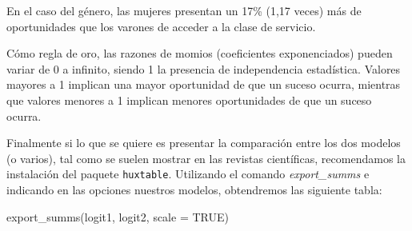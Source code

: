 \documentclass[
]{book}
\newenvironment{Shaded}{\begin{snugshade}}{\end{snugshade}}
\newcommand{\AttributeTok}[1]{\textcolor[rgb]{0.77,0.63,0.00}{#1}}
\newcommand{\ConstantTok}[1]{\textcolor[rgb]{0.00,0.00,0.00}{#1}}
\newcommand{\FunctionTok}[1]{\textcolor[rgb]{0.00,0.00,0.00}{#1}}
\newcommand{\NormalTok}[1]{#1}
\begin{document}
En el caso del género, las mujeres presentan un 17\% (1,17 veces) más de oportunidades que los varones de acceder a la clase de servicio.

Cómo regla de oro, las razones de momios (coeficientes exponenciados) pueden variar de 0 a infinito, siendo 1 la presencia de independencia estadística. Valores mayores a 1 implican una mayor oportunidad de que un suceso ocurra, mientras que valores menores a 1 implican menores oportunidades de que un suceso ocurra.

Finalmente si lo que se quiere es presentar la comparación entre los dos modelos (o varios), tal como se suelen mostrar en las revistas científicas, recomendamos la instalación del paquete \texttt{huxtable}. Utilizando el comando \emph{export\_summs} e indicando en las opciones nuestros modelos, obtendremos las siguiente tabla:

\begin{Shaded}
\begin{Highlighting}[]
\FunctionTok{export\_summs}\NormalTok{(logit1, logit2, }\AttributeTok{scale =} \ConstantTok{TRUE}\NormalTok{)}
\end{Highlighting}
\end{Shaded}

 
  \providecommand{\huxb}[2]{\arrayrulecolor[RGB]{#1}\global\arrayrulewidth=#2pt}
  \providecommand{\huxvb}[2]{\color[RGB]{#1}\vrule width #2pt}
  \providecommand{\huxtpad}[1]{\rule{0pt}{#1}}
  \providecommand{\huxbpad}[1]{\rule[-#1]{0pt}{#1}}
\end{document}
